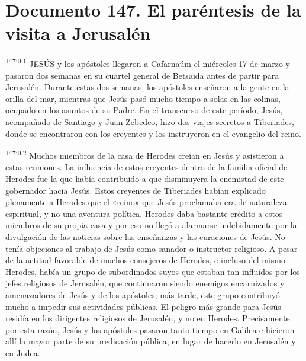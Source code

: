 \chapter{Documento 147. El paréntesis de la visita a Jerusalén}
\par 
\textsuperscript{147:0.1} JESÚS y los apóstoles llegaron a Cafarnaúm el miércoles 17 de marzo y pasaron dos semanas en su cuartel general de Betsaida antes de partir para Jerusalén. Durante estas dos semanas, los apóstoles enseñaron a la gente en la orilla del mar, mientras que Jesús pasó mucho tiempo a solas en las colinas, ocupado en los asuntos de su Padre. En el transcurso de este período, Jesús, acompañado de Santiago y Juan Zebedeo, hizo dos viajes secretos a Tiberiades, donde se encontraron con los creyentes y los instruyeron en el evangelio del reino.

\par 
\textsuperscript{147:0.2} Muchos miembros de la casa de Herodes creían en Jesús y asistieron a estas reuniones. La influencia de estos creyentes dentro de la familia oficial de Herodes fue la que había contribuido a que disminuyera la enemistad de este gobernador hacia Jesús. Estos creyentes de Tiberiades habían explicado plenamente a Herodes que el «reino» que Jesús proclamaba era de naturaleza espiritual, y no una aventura política. Herodes daba bastante crédito a estos miembros de su propia casa y por eso no llegó a alarmarse indebidamente por la divulgación de las noticias sobre las enseñanzas y las curaciones de Jesús. No tenía objeciones al trabajo de Jesús como sanador o instructor religioso. A pesar de la actitud favorable de muchos consejeros de Herodes, e incluso del mismo Herodes, había un grupo de subordinados suyos que estaban tan influídos por los jefes religiosos de Jerusalén, que continuaron siendo enemigos encarnizados y amenazadores de Jesús y de los apóstoles; más tarde, este grupo contribuyó mucho a impedir sus actividades públicas. El peligro más grande para Jesús residía en los dirigentes religiosos de Jerusalén, y no en Herodes. Precisamente por esta razón, Jesús y los apóstoles pasaron tanto tiempo en Galilea e hicieron allí la mayor parte de su predicación pública, en lugar de hacerlo en Jerusalén y en Judea.

